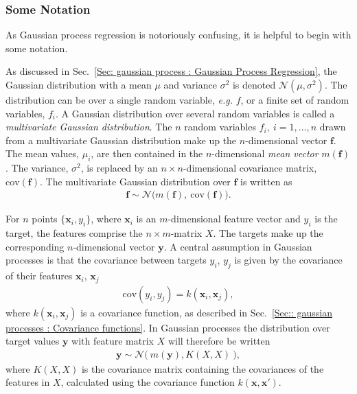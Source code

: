 \documentclass[twoside,english]{uiofysmaster}
\begin{document}
{\subsubsection{Some Notation}

As Gaussian process regression is notoriously confusing, it is helpful to begin with some notation. 

As discussed in Sec.~\ref{Sec: gaussian process : Gaussian Process Regression}, the Gaussian distribution with a mean $\mu$ and variance $\sigma^2$ is denoted $\mathcal{N}(\mu, \sigma^2)$. The distribution can be over a single random variable, \textit{e.g.} $f$, or a finite set of random variables, $f_i$. A Gaussian distribution over several random variables is called a \textit{multivariate Gaussian distribution}. The $n$ random variables $f_i, ~i=1,...,n$ drawn from a multivariate Gaussian distribution make up the $n$-dimensional vector $\textbf{f}$. The mean values, $\mu_i$, are then contained in the $n$-dimensional \textit{mean vector} $m(\textbf{f})$. The variance, $\sigma^2$, is replaced by an $n \times n$-dimensional covariance matrix, $\text{cov}(\textbf{f})$. The multivariate Gaussian distribution over $\textbf{f}$ is written as
\begin{align}
\textbf{f} \sim \mathcal{N} \big(m(\textbf{f}), ~\text{cov}(\textbf{f})  \big).
\end{align}  

For $n$ points $\{\textbf{x}_i , y_i\}$, where $\textbf{x}_i$ is an $m$-dimensional feature vector and $y_i$ is the target, the features comprise the $n \times m$-matrix $X$. The targets make up the corresponding $n$-dimensional vector $\textbf{y}$. A central assumption in Gaussian processes is that the covariance between targets $y_i$, $y_j$ is given by the covariance of their features $\textbf{x}_i$, $\textbf{x}_j$
\begin{align}
\text{cov}(y_i, y_j) = k(\textbf{x}_i, \textbf{x}_j),
\end{align}
where $k(\textbf{x}_i, \textbf{x}_j)$ is a covariance function, as described in Sec.~\ref{Sec:: gaussian processes : Covariance functions}. In Gaussian processes the distribution over target values $\textbf{y}$ with feature matrix $X$ will therefore be written
\begin{align}\label{Eq:: gaussian process : Normal distribution GP}
\textbf{y} \sim \mathcal{N} \big(~m( \textbf{y} ), K(X, X) ~\big),
\end{align}
where $K(X,X)$ is the covariance matrix containing the covariances of the features in $X$, calculated using the covariance function $k(\textbf{x}, \textbf{x}')$.

}
\end{document}
